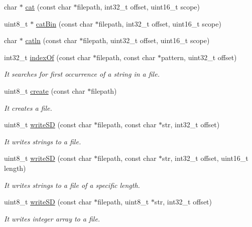 \begin{DoxyCompactItemize}
char $\ast$ \hyperlink{class_wasp_s_d_a9a0793484b24874485636faa8ca69f13}{cat} (const char $\ast$filepath, int32\+\_\+t offset, uint16\+\_\+t scope)
\item 
uint8\+\_\+t $\ast$ \hyperlink{class_wasp_s_d_a8945e40f481051c716cb55eeb3d7239f}{cat\+Bin} (const char $\ast$filepath, int32\+\_\+t offset, uint16\+\_\+t scope)
\item 
char $\ast$ \hyperlink{class_wasp_s_d_abdf079d3b5df4c9448728eccd166c766}{catln} (const char $\ast$filepath, uint32\+\_\+t offset, uint16\+\_\+t scope)
\item 
int32\+\_\+t \hyperlink{class_wasp_s_d_ab3554bc532af01d7fd13055f67315f41}{index\+Of} (const char $\ast$filepath, const char $\ast$pattern, uint32\+\_\+t offset)
\begin{DoxyCompactList}\small\item\em It searches for first occurrence of a string in a file. \end{DoxyCompactList}\item 
uint8\+\_\+t \hyperlink{class_wasp_s_d_a2fdf92f5da909563a3dd0a6281e7a554}{create} (const char $\ast$filepath)
\begin{DoxyCompactList}\small\item\em It creates a file. \end{DoxyCompactList}\item 
uint8\+\_\+t \hyperlink{class_wasp_s_d_aaafd1dc6c0962e06ff3287a83e5f8787}{write\+SD} (const char $\ast$filepath, const char $\ast$str, int32\+\_\+t offset)
\begin{DoxyCompactList}\small\item\em It writes strings to a file. \end{DoxyCompactList}\item 
uint8\+\_\+t \hyperlink{class_wasp_s_d_af655e871a7e95f1fdc45b404242146e6}{write\+SD} (const char $\ast$filepath, const char $\ast$str, int32\+\_\+t offset, uint16\+\_\+t length)
\begin{DoxyCompactList}\small\item\em It writes strings to a file of a specific length. \end{DoxyCompactList}\item 
uint8\+\_\+t \hyperlink{class_wasp_s_d_ad79940d0888cc77dacb76d3b83ea390f}{write\+SD} (const char $\ast$filepath, uint8\+\_\+t $\ast$str, int32\+\_\+t offset)
\begin{DoxyCompactList}\small\item\em It writes integer array to a file. \end{DoxyCompactList}\item 

\end{DoxyCompactItemize}
